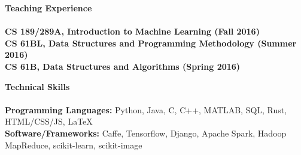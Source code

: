 \documentclass{article}
\begin{document}
\noindent
\textbf{{\Large Teaching Experience}}\\[-2mm]
\HRule\\
\hspace*{1.1mm}\textbf{CS 189/289A, Introduction to Machine Learning (Fall 2016)} \\
\vspace{0.5mm}
\textbf{CS 61BL, Data Structures and Programming Methodology (Summer 2016)} \\
\vspace{0.5mm}
\textbf{CS 61B, Data Structures and Algorithms (Spring 2016)}
\vspace{2.0mm}

\noindent
\textbf{\Large Technical Skills}\\[-2mm]
\HRule\\
\textbf{Programming Languages:} Python, Java, C, C++, MATLAB, SQL, Rust, HTML/CSS/JS, \LaTeX \\
\textbf{Software/Frameworks:} Caffe, Tensorflow, Django, Apache Spark, Hadoop MapReduce, scikit-learn, scikit-image


\end{document}
